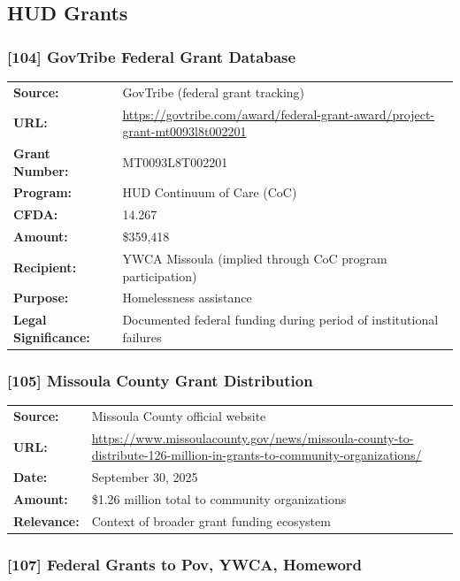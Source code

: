 \documentclass[11pt,letterpaper]{article}
\newcommand{\citeref}[1]{\textbf{\color{NavyBlue}[#1]}}
\begin{document}
\subsection{HUD Grants}

\subsubsection{\citeref{104} GovTribe Federal Grant Database}

\begin{tabular}{@{}p{1.4in}p{4.6in}@{}}
\textbf{Source:} & GovTribe (federal grant tracking)\\
\textbf{URL:} & \url{https://govtribe.com/award/federal-grant-award/project-grant-mt0093l8t002201}\\
\textbf{Grant Number:} & MT0093L8T002201\\
\textbf{Program:} & HUD Continuum of Care (CoC)\\
\textbf{CFDA:} & 14.267\\
\textbf{Amount:} & \$359,418\\
\textbf{Recipient:} & YWCA Missoula (implied through CoC program participation)\\
\textbf{Purpose:} & Homelessness assistance\\
\textbf{Legal Significance:} & Documented federal funding during period of institutional failures\\
\end{tabular}

\subsubsection{\citeref{105} Missoula County Grant Distribution}

\begin{tabular}{@{}p{1.4in}p{4.6in}@{}}
\textbf{Source:} & Missoula County official website\\
\textbf{URL:} & \url{https://www.missoulacounty.gov/news/missoula-county-to-distribute-126-million-in-grants-to-community-organizations/}\\
\textbf{Date:} & September 30, 2025\\
\textbf{Amount:} & \$1.26 million total to community organizations\\
\textbf{Relevance:} & Context of broader grant funding ecosystem\\
\end{tabular}

\subsubsection{\citeref{107} Federal Grants to Pov, YWCA, Homeword}
\end{document}
